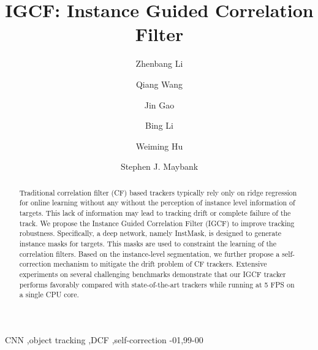 \documentclass[review]{elsarticle}
\begin{document}
\begin{frontmatter}

\title{IGCF: Instance Guided Correlation Filter}

\author[address1,address3]{Zhenbang Li}
\author[address1,address3]{Qiang Wang}
\author[address1]{Jin Gao}
\author[address1]{Bing Li}
\author[address1,address2,address3]{Weiming Hu}
\author[address4]{Stephen J. Maybank}
\address[address1]{National Laboratory of Pattern Recognition, Institute of Automation, Chinese Academy of Sciences, Beijing 100190, PR China}
\address[address2]{CAS Center for Excellence in Brain Science and Intelligence Technology, Chinese Academy of Sciences, Beijing 100190, PR China}
\address[address3]{University of Chinese Academy of Sciences, Beijing 100190, PR China}
\address[address4]{Department of Computer Science and Information Systems, Birkbeck College, London WC1E 7HX, United Kingdom}

\begin{abstract}
Traditional correlation filter (CF) based trackers typically rely only on ridge regression for online learning without any without the perception of instance level information of targets. This lack of information may lead to tracking drift or complete failure of the track. We propose the Instance Guided Correlation Filter (IGCF) to improve tracking robustness. Specifically, a deep network, namely InstMask, is designed to generate instance masks for targets. This masks are used to constraint the learning of the correlation filters. Based on the instance-level segmentation, we further propose a self-correction mechanism to mitigate the drift problem of CF trackers. Extensive experiments on several challenging benchmarks demonstrate that our IGCF tracker performs favorably compared with state-of-the-art trackers while running at 5 FPS on a single CPU core.
\end{abstract}

\begin{keyword}
CNN \sep object tracking \sep DCF \sep self-correction
-01\sep  99-00
\end{keyword}

\end{frontmatter}

\linenumbers
\end{document}

